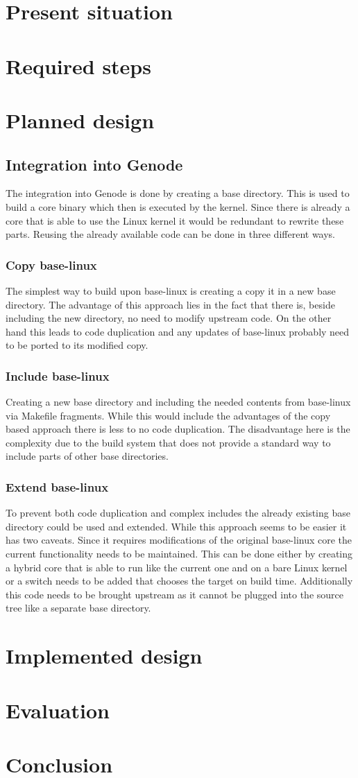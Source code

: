 \documentclass[
a4paper,
12pt,
notitlepage,
parskip=half,
DIV=11,
]{scrbook}
\begin{document}
	\chapter{Present situation} %
	\chapter{Required steps} %
	\chapter{Planned design}
		\section{Integration into Genode}
		The integration into Genode is done by creating a base directory.
		This is used to build a core binary which then is executed by the kernel.
		Since there is already a core that is able to use the Linux kernel it would be redundant to rewrite these parts.
		Reusing the already available code can be done in three different ways.
		\subsection{Copy base-linux}
		The simplest way to build upon base-linux is creating a copy it in a new base directory.
		The advantage of this approach lies in the fact that there is, beside including the new directory, no need to modify upstream code.
		On the other hand this leads to code duplication and any updates of base-linux probably need to be ported to its modified copy.
		\subsection{Include base-linux}
		Creating a new base directory and including the needed contents from base-linux via Makefile fragments.
		While this would include the advantages of the copy based approach there is less to no code duplication.
		The disadvantage here is the complexity due to the build system that does not provide a standard way to include parts of other base directories.
		\subsection{Extend base-linux}
		To prevent both code duplication and complex includes the already existing base directory could be used and extended.
		While this approach seems to be easier it has two caveats.
		Since it requires modifications of the original base-linux core the current functionality needs to be maintained.
		This can be done either by creating a hybrid core that is able to run like the current one and on a bare Linux kernel or a switch needs to be added that chooses the target on build time.
		Additionally this code needs to be brought upstream as it cannot be plugged into the source tree like a separate base directory.
	\chapter{Implemented design}
	\chapter{Evaluation}
	\chapter{Conclusion}
	
	
	
	
\end{document}
